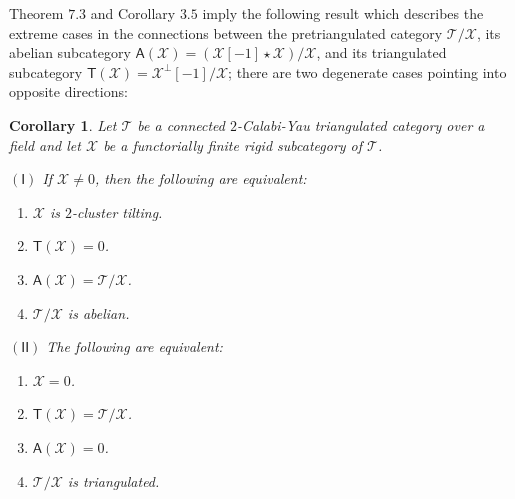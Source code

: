 \documentclass[oneside, a4paper,reqno]{amsart}
\numberwithin{equation}{section}
\newtheorem{cor}[thm]{Corollary}
\theoremstyle{definition}
\begin{document}
Theorem $7.3$ and Corollary $3.5$ imply the following result which describes the extreme cases in the connections between the pretriangulated category ${\mathcal T}/{\mathcal X}$, its abelian subcategory $\mathsf{A}({\mathcal X}) = ({\mathcal X}[-1]\star{\mathcal X})/{\mathcal X}$, and its triangulated subcategory $\mathsf{T}({\mathcal X}) = {\mathcal X}^{\bot}[-1]/{\mathcal X}$; there are two degenerate cases pointing into opposite directions:

  

\begin{cor} Let ${\mathcal T}$ be a connected $2$-Calabi-Yau triangulated category over a field and let ${\mathcal X}$ be a  functorially finite rigid subcategory of ${\mathcal T}$.

\smallskip

\begin{minipage}{8cm}
$\mathsf{(I)}$ If ${\mathcal X} \neq 0$, then the following are equivalent:
\begin{enumerate}
\item ${\mathcal X}$ is $2$-cluster tilting.
\item $\mathsf{T}({\mathcal X}) = 0$.
\item $\mathsf{A}({\mathcal X}) = {\mathcal T}/{\mathcal X}$.
\item ${\mathcal T}/{\mathcal X}$ is abelian. 
\end{enumerate}
\end{minipage}
\begin{minipage}{5cm}
$\mathsf{(II)}$ The following are equivalent:
\begin{enumerate}
\item ${\mathcal X} = 0$.
\item $\mathsf{T}({\mathcal X}) = {\mathcal T}/{\mathcal X}$. 
\item $\mathsf{A}({\mathcal X}) = 0$.
\item ${\mathcal T}/{\mathcal X}$ is triangulated. 
\end{enumerate} 
\end{minipage}
\end{cor}
\end{document}
